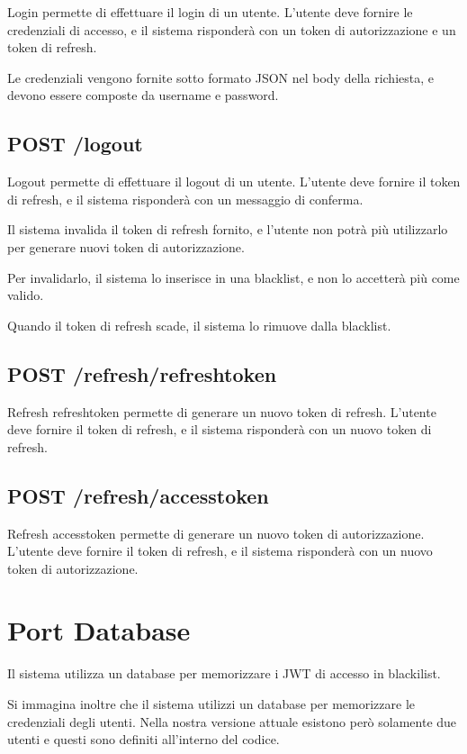 Login permette di effettuare il login di un utente. L'utente deve fornire le credenziali di accesso, e il sistema risponderà con un token di autorizzazione e un token di refresh.

Le credenziali vengono fornite sotto formato JSON nel body della richiesta, e devono essere composte da username e password.


\subsection{POST /logout}

Logout permette di effettuare il logout di un utente. L'utente deve fornire il token di refresh, e il sistema risponderà con un messaggio di conferma.

Il sistema invalida il token di refresh fornito, e l'utente non potrà più utilizzarlo per generare nuovi token di autorizzazione.

Per invalidarlo, il sistema lo inserisce in una blacklist, e non lo accetterà più come valido.

Quando il token di refresh scade, il sistema lo rimuove dalla blacklist.

\subsection{POST /refresh/refreshtoken}

Refresh refreshtoken permette di generare un nuovo token di refresh. L'utente deve fornire il token di refresh, e il sistema risponderà con un nuovo token di refresh.

\subsection{POST /refresh/accesstoken}

Refresh accesstoken permette di generare un nuovo token di autorizzazione. L'utente deve fornire il token di refresh, e il sistema risponderà con un nuovo token di autorizzazione.

\section{Port Database}

Il sistema utilizza un database per memorizzare i JWT di accesso in blackilist.

Si immagina inoltre che il sistema utilizzi un database per memorizzare le credenziali degli utenti. Nella nostra versione attuale esistono però solamente due utenti e questi sono definiti all'interno del codice.


